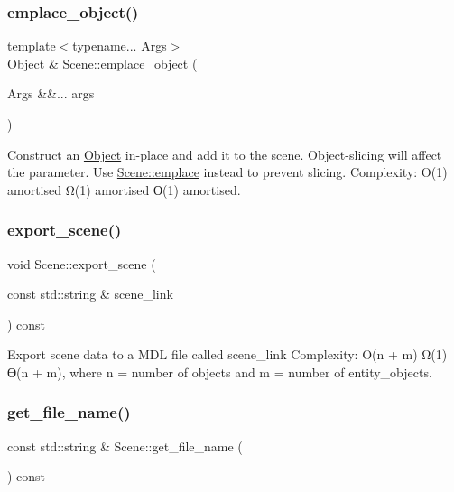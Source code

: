 \subsubsection{\texorpdfstring{emplace\+\_\+object()}{emplace\_object()}}
{\footnotesize\ttfamily template$<$typename... Args$>$ \\
\mbox{\hyperlink{class_object}{Object}} \& Scene\+::emplace\+\_\+object (\begin{DoxyParamCaption}\item[{Args \&\&...}]{args }\end{DoxyParamCaption})}

Construct an \mbox{\hyperlink{class_object}{Object}} in-\/place and add it to the scene. Object-\/slicing will affect the parameter. Use \mbox{\hyperlink{class_scene_ab49d36bd44583a0374eedf41ccce75d3}{Scene\+::emplace}} instead to prevent slicing. Complexity\+: O(1) amortised Ω(1) amortised ϴ(1) amortised. \mbox{\label{class_scene_a65b10c0a127b5f811869a605b70c5a72}} 
\subsubsection{\texorpdfstring{export\+\_\+scene()}{export\_scene()}}
{\footnotesize\ttfamily void Scene\+::export\+\_\+scene (\begin{DoxyParamCaption}\item[{const std\+::string \&}]{scene\+\_\+link }\end{DoxyParamCaption}) const}

Export scene data to a M\+DL file called scene\+\_\+link Complexity\+: O(n + m) Ω(1) ϴ(n + m), where n = number of objects and m = number of entity\+\_\+objects. \mbox{\label{class_scene_ad421371655da7444220b21ba150ee3ce}} 
\subsubsection{\texorpdfstring{get\+\_\+file\+\_\+name()}{get\_file\_name()}}
{\footnotesize\ttfamily const std\+::string \& Scene\+::get\+\_\+file\+\_\+name (\begin{DoxyParamCaption}{ }\end{DoxyParamCaption}) const}

